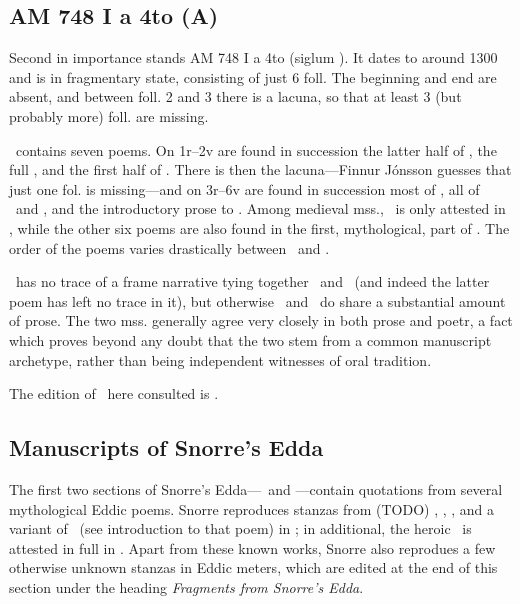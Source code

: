 \subsection{AM 748 I a 4to (A)}

Second in importance stands AM 748 I a 4to (siglum \AM).  It dates to around 1300 and is in fragmentary state, consisting of just 6 foll.  The beginning and end are absent, and between foll. 2 and 3 there is a lacuna, so that at least 3 (but probably more) foll. are missing.

\AM\ contains seven poems.  On 1r–2v are found in succession the latter half of \Harbardsljod, the full \Baldrsdraumar, and the first half of \Skirnismal.  There is then the lacuna—Finnur Jónsson guesses that just one fol. is missing—and on 3r–6v are found in succession most of \Vafthrudnismal, all of \Grimnismal\ and \Hymiskvida, and the introductory prose to \Volundarkvida.  Among medieval mss., \Baldrsdraumar\ is only attested in \AM, while the other six poems are also found in the first, mythological, part of \Regius. The order of the poems varies drastically between \AM\ and \Regius.

\AM\ has no trace of a frame narrative tying together \Hymiskvida\ and \Lokasenna\ (and indeed the latter poem has left no trace in it), but otherwise \AM\ and \Regius\ do share a substantial amount of prose.  The two mss. generally agree very closely in both prose and poetr, a fact which proves beyond any doubt that the two stem from a common manuscript archetype, rather than being independent witnesses of oral tradition.

The edition of \AM\ here consulted is \textcite{Finnur1896}.

\subsection{Manuscripts of Snorre’s Edda}

The first two sections of Snorre’s Edda—\Gylfaginning\ and \Skaldskaparmal—contain quotations from several mythological Eddic poems.  Snorre reproduces stanzas from (TODO) \Voluspa, \Vafthrudnismal, \Grimnismal, and a variant of \Lokasenna\ (see introduction to that poem) in \Gylfaginning; in additional, the heroic \Grottasongr\ is attested in full in \Skaldskaparmal.  Apart from these known works, Snorre also reprodues a few otherwise unknown stanzas in Eddic meters, which are edited at the end of this section under the heading \emph{Fragments from Snorre’s Edda}.

